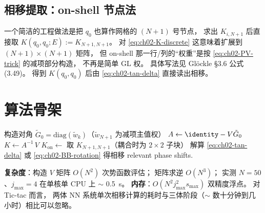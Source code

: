 \subsection{相移提取：on-shell 节点法}

一个简洁的工程做法是把 $q_0$ 也算作网格的 $(N+1)$ 号节点，
求出 $K_{i, N+1}$ 后直接取 $K(q_0, q_0; E) := K_{N+1, N+1}$。
对 \cref{eq:ch02-K-discrete} 这意味着扩展到 $(N+1) \times (N+1)$ 矩阵，
但 on-shell 那一行/列的“权重”是按 \cref{eq:ch02-PV-trick} 的减项部分构造，
不再是简单 GL 权。
具体写法见 Glöckle \cite{Glockle1983} §3.6 公式 (3.49)。
得到 $K(q_0, q_0)$ 后由 \cref{eq:ch02-tan-delta} 直接读出相移。

\section{算法骨架}
\label{sec:ch02-algo}

\begin{algorithm}[H]
  \caption{两体 LS 求解：固定能量 $E$、固定耦合通道 $(j, s, t)$，输出 K-matrix 与相移}
  \label{alg:ch02-LS-K}

  构造对角 $\tilde{G}_0 = \mathrm{diag}(\tilde{w}_k)$（$\tilde{w}_{N+1}$ 为减项主值权）\;
  $A \leftarrow \identity - V \tilde{G}_0$\;
  $K \leftarrow A^{-1}\, V$ 
  $K_{\text{on}} \leftarrow$ 取 $K_{N+1, N+1}$（耦合时为 $2\times 2$ 子块）\;
  解算 \cref{eq:ch02-tan-delta} 或 \cref{eq:ch02-BB-rotation} 得相移\;
  \Return relevant phase shifts.
\end{algorithm}

\textbf{复杂度}：构造 $V$ 矩阵 $O(N^2)$ 次势函数评估；
矩阵求逆 $O(N^3)$；
实测 $N = 50$、$j_{\max} = 4$ 在单核单 CPU 上 $\sim$ \SI{0.5}{s}。
\textbf{内存}：$O(N^2 j_{\max}^2 s_{\max})$ 双精度浮点。
对 Tic-tac 而言，
两体 NN 系统单次相移计算的耗时与三体阶段（$\sim$ 数十分钟到几小时）相比可以忽略。

